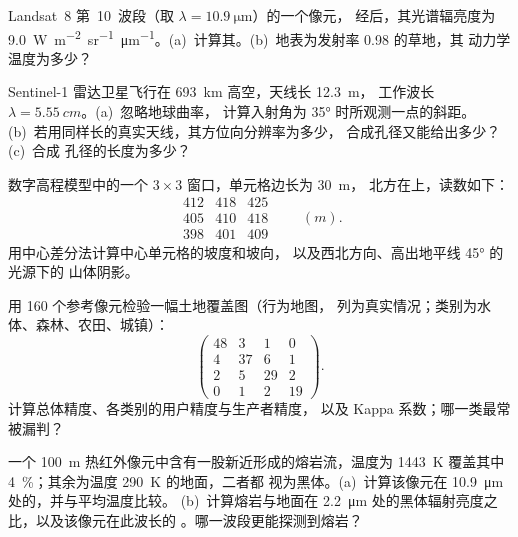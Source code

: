 \begin{exercise}[$\star\star$]\label{exo:b3:remote-sensing-gis:5}
Landsat~8 第~10~波段（取 $\lambda = \qty{10.9}{\micro\metre}$）的一个像元，
经后，其光谱辐亮度为
\qty{9.0}{W.m^{-2}.sr^{-1}.\micro\metre^{-1}}。(a)~计算其。(b)~地表为发射率 0.98 的草地，其
动力学温度为多少？
\end{exercise}

\begin{exercise}[$\star\star$]\label{exo:b3:remote-sensing-gis:6}
Sentinel-1 雷达卫星飞行在 \qty{693}{km} 高空，天线长 \qty{12.3}{m}，
工作波长 $\lambda = \qty{5.55}{cm}$。(a)~忽略地球曲率，
计算入射角为
\ang{35} 时所观测一点的斜距。(b)~若用同样长的真实天线，其方位向分辨率为多少，
合成孔径又能给出多少？(c)~合成
孔径的长度为多少？
\end{exercise}

\begin{exercise}[$\star\star$]\label{exo:b3:remote-sensing-gis:7}
数字高程模型中的一个 $3\times3$ 窗口，单元格边长为 \qty{30}{m}，
北方在上，读数如下：
\[
\begin{matrix} 412 & 418 & 425 \\ 405 & 410 & 418 \\ 398 & 401 & 409 \end{matrix}
\qquad (\unit{m}).
\]
用中心差分法计算中心单元格的坡度和坡向，
以及西北方向、高出地平线 \ang{45} 的光源下的
山体阴影。
\end{exercise}

\begin{exercise}[$\star\star$]\label{exo:b3:remote-sensing-gis:8}
用 160 个参考像元检验一幅土地覆盖图（行为地图，
列为真实情况；类别为水体、森林、农田、城镇）：
\[
\begin{pmatrix} 48 & 3 & 1 & 0 \\ 4 & 37 & 6 & 1 \\ 2 & 5 & 29 & 2 \\ 0 & 1 & 2 & 19 \end{pmatrix} .
\]
计算总体精度、各类别的用户精度与生产者精度，
以及 Kappa 系数；哪一类最常被漏判？
\end{exercise}

\begin{exercise}[$\star\star$]\label{exo:b3:remote-sensing-gis:9}
一个 \qty{100}{m} 热红外像元中含有一股新近形成的熔岩流，温度为 \qty{1443}{K}
覆盖其中 \qty{4}{\percent}；其余为温度 \qty{290}{K} 的地面，二者都
视为黑体。(a)~计算该像元在
\qty{10.9}{\micro\metre} 处的，并与平均温度比较。
(b)~计算熔岩与地面在
\qty{2.2}{\micro\metre} 处的黑体辐射亮度之比，以及该像元在此波长的
。哪一波段更能探测到熔岩？
\end{exercise}

